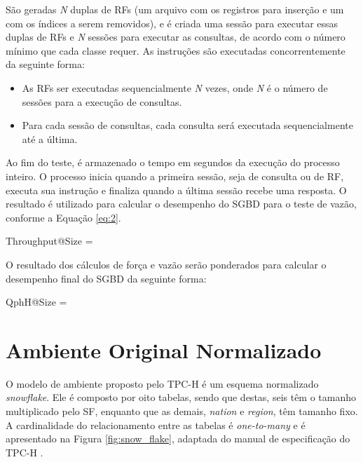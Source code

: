 São geradas \textit{N} duplas de RFs (um arquivo com os registros para inserção e um com os índices a serem removidos), e é criada uma sessão para executar essas duplas de RFs e \textit{N} sessões para executar as consultas, de acordo com o número mínimo que cada classe requer. As instruções são executadas concorrentemente da seguinte forma:

\begin{itemize}
	\item As RFs ser executadas sequencialmente \textit{N} vezes, onde \textit{N} é o número de sessões para a execução de consultas.
	\item Para cada sessão de consultas, cada consulta será executada sequencialmente até a última.
\end{itemize}

Ao fim do teste, é armazenado o tempo em segundos da execução do processo inteiro. O processo inicia quando a primeira sessão, seja de consulta ou de RF, executa sua instrução e finaliza quando a última sessão recebe uma resposta. O resultado é utilizado para calcular o desempenho do SGBD para o teste de vazão, conforme a Equação \ref{eq:2}.

\begin{myequation}%
\label{eq:2}
{\scriptstyle Throughput@Size} =  %
\end{myequation}
%

O resultado dos cálculos de força e vazão serão ponderados para calcular o desempenho final do SGBD da seguinte forma:

\begin{myequation}%
\label{eq:3}
{ \scriptstyle QphH@Size =  } %
\end{myequation}
%

\section{Ambiente Original Normalizado}
\label{ambiente_1}

O modelo de ambiente proposto pelo TPC-H é um esquema normalizado \textit{snowflake}. Ele é composto por oito tabelas, sendo que destas, seis têm o tamanho multiplicado pelo SF, enquanto que as demais, \textit{nation} e \textit{region}, têm tamanho fixo. A cardinalidade do relacionamento entre as tabelas é \textit{one-to-many} e é apresentado na Figura \ref{fig:snow_flake}, adaptada do manual de especificação do TPC-H \cite{tpc2017specs}.

